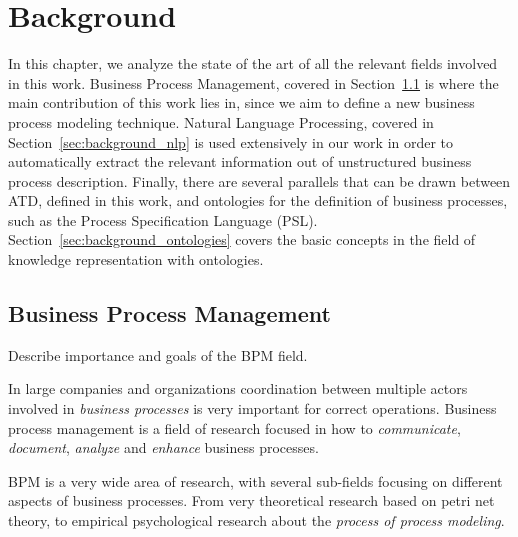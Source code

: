\chapter{Background}
\label{cha:background}

In this chapter, we analyze the state of the art of all the relevant fields
involved in this work. Business Process Management, covered in
Section~\ref{sec:background_bpm} is where the main contribution of this work
lies in, since we aim to define a new business process modeling technique.
Natural Language Processing, covered in Section~\ref{sec:background_nlp} is used
extensively in our work in order to automatically extract the relevant
information out of unstructured business process description. Finally, there are
several parallels that can be drawn between ATD, defined in this work, and
ontologies for the definition of business processes, such as the Process
Specification Language (PSL). Section~\ref{sec:background_ontologies} covers the basic
concepts in the field of knowledge representation with ontologies.

\section{Business Process Management}
\label{sec:background_bpm}


Describe importance and goals of the BPM field.

In large companies and organizations coordination between multiple actors
involved in \textit{business processes} is very important for correct
operations. Business process management is a field of research focused in how to  
\textit{communicate}, \textit{document}, \textit{analyze} and \textit{enhance}
business processes.

BPM is a very wide area of research, with several sub-fields focusing on
different aspects of business processes. From very theoretical research based on
petri net theory\cite{citation needed}, to empirical psychological research
about the \emph{process of process modeling}\cite{citation needed}.

